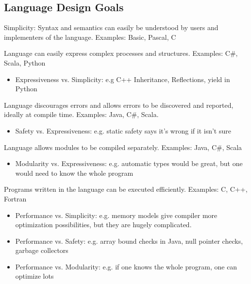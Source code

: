 \subsection{Language Design Goals}
\begin{mytitle}[Simplicity] Simplicity: Syntax and semantics can easily be understood by users and implementers of the language. Examples: Basic, Pascal, C
\end{mytitle}
\begin{mytitle}[Expressiveness] Language can easily express complex processes and structures. Examples: C\#, Scala, Python
\begin{itemize}
    \item Expressiveness vs. Simplicity: e.g C++ Inheritance, Reflections, yield in Python
\end{itemize}
\end{mytitle}
\begin{mytitle} Language discourages errors and allows errors to be discovered and reported, ideally at compile time. Examples: Java, C\#, Scala. 
\begin{itemize}
    \item Safety vs. Expressiveness: e.g. static safety says it's wrong if it isn't sure
\end{itemize}
\end{mytitle}
\begin{mytitle}[Modularity] Language allows modules to be compiled separately. Examples: Java, C\#, Scala
\begin{itemize}
    \item Modularity vs. Expressiveness: e.g. automatic types would be great, but one would need to know the whole program
\end{itemize}
\end{mytitle}
\begin{mytitle}[Performance] Programs written in the language can be executed efficiently. Examples: C, C++, Fortran
\begin{itemize}
    \item Performance vs. Simplicity: e.g. memory models give compiler more optimization possibilities, but they are hugely complicated.
    \item Performance vs. Safety: e.g. array bound checks in Java, null pointer checks, garbage collectors
    \item Performance vs. Modularity: e.g. if one knows the whole program, one can optimize lots
\end{itemize}
\end{mytitle}
